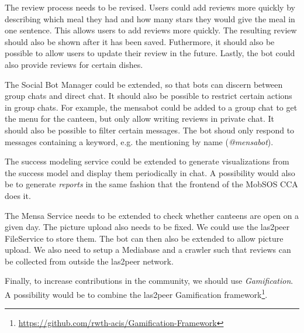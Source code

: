 The review process needs to be revised. Users could add reviews more quickly by describing which meal they had and how many stars they would give the meal in one sentence. This allows users to add reviews more quickly. The resulting review should also be shown after it has been saved. Futhermore, it should also be possible to allow users to update their review in the future. Lastly, the bot could also provide reviews for certain dishes.

The Social Bot Manager could be extended, so that bots can discern between group chats and direct chat. It should also be possible to restrict certain actions in group chats. For example, the mensabot could be added to a group chat to get the menu for the canteen, but only allow writing reviews in private chat.
It should also be possible to filter certain messages. The bot shoud only respond to messages containing a keyword, e.g. the mentioning by name (\emph{@mensabot}).

The success modeling service could be extended to generate visualizations from the success model and display them periodically in chat. A possibility would also be to generate \emph{reports} in the same fashion that the frontend of the MobSOS CCA does it. 

The Mensa Service needs to be extended to check whether canteens are open on a given day. The picture upload also needs to be fixed. We could use the las2peer FileService to store them. The bot can then also be extended to allow picture upload. 
We also need to setup a Mediabase and a crawler such that reviews can be collected from outside the las2peer network. 

Finally, to increase contributions in the community, we should use \emph{Gamification}. A possibility would be to combine the las2peer Gamification framework\footnote{\url{https://github.com/rwth-acis/Gamification-Framework}}.